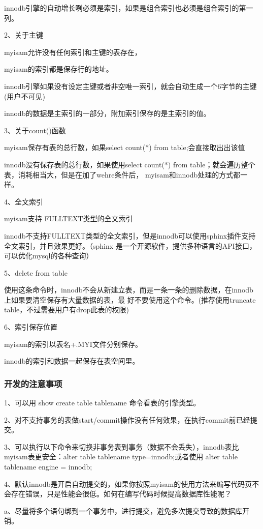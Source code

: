 \documentclass[UTF8]{ctexart}
\begin{document}
innodb引擎的自动增长咧必须是索引，如果是组合索引也必须是组合索引的第一列。

2、关于主键

myisam允许没有任何索引和主键的表存在，

myisam的索引都是保存行的地址。

innodb引擎如果没有设定主键或者非空唯一索引，就会自动生成一个6字节的主键(用户不可见)

innodb的数据是主索引的一部分，附加索引保存的是主索引的值。

3、关于count()函数

myisam保存有表的总行数，如果select count(*) from table;会直接取出出该值

innodb没有保存表的总行数，如果使用select count(*) from table；就会遍历整个表，消耗相当大，但是在加了wehre条件后，
myisam和innodb处理的方式都一样。

4、全文索引

myisam支持 FULLTEXT类型的全文索引

innodb不支持FULLTEXT类型的全文索引，但是innodb可以使用sphinx插件支持全文索引，并且效果更好。（sphinx   是一个开源软件，提供多种语言的API接口，可以优化mysql的各种查询）

5、delete from table

使用这条命令时，innodb不会从新建立表，而是一条一条的删除数据，在innodb上如果要清空保存有大量数据的表，最       好不要使用这个命令。(推荐使用truncate table，不过需要用户有drop此表的权限)

6、索引保存位置

myisam的索引以表名+.MYI文件分别保存。

innodb的索引和数据一起保存在表空间里。

\subsubsection{开发的注意事项}

1、可以用 show create table tablename 命令看表的引擎类型。

2、对不支持事务的表做start/commit操作没有任何效果，在执行commit前已经提交。

3、可以执行以下命令来切换非事务表到事务（数据不会丢失），innodb表比myisam表更安全：alter table tablename type=innodb;或者使用 alter table tablename engine = innodb;

4、默认innodb是开启自动提交的，如果你按照myisam的使用方法来编写代码页不会存在错误，只是性能会很低。如何在编写代码时候提高数据库性能呢？

a、尽量将多个语句绑到一个事务中，进行提交，避免多次提交导致的数据库开销。
\end{document}
